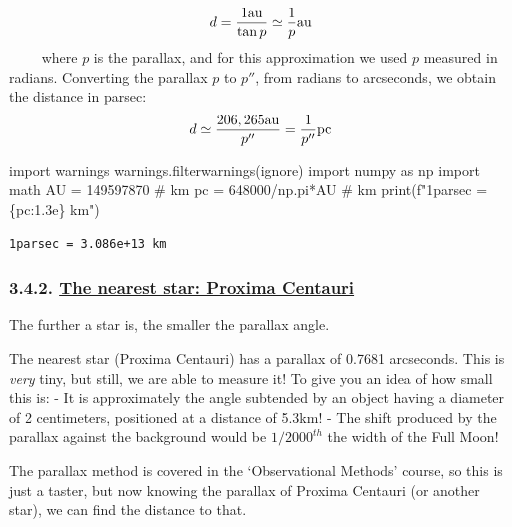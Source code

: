 \documentclass[
  letterpaper,
  DIV=11,
  numbers=noendperiod]{scrartcl}
\newenvironment{Shaded}{\begin{snugshade}}{\end{snugshade}}
\newcommand{\BuiltInTok}[1]{\textcolor[rgb]{0.00,0.23,0.31}{#1}}
\newcommand{\CommentTok}[1]{\textcolor[rgb]{0.37,0.37,0.37}{#1}}
\newcommand{\DecValTok}[1]{\textcolor[rgb]{0.68,0.00,0.00}{#1}}
\newcommand{\ImportTok}[1]{\textcolor[rgb]{0.00,0.46,0.62}{#1}}
\newcommand{\NormalTok}[1]{\textcolor[rgb]{0.00,0.23,0.31}{#1}}
\newcommand{\OperatorTok}[1]{\textcolor[rgb]{0.37,0.37,0.37}{#1}}
\newcommand{\SpecialCharTok}[1]{\textcolor[rgb]{0.37,0.37,0.37}{#1}}
\newcommand{\SpecialStringTok}[1]{\textcolor[rgb]{0.13,0.47,0.30}{#1}}
\newcommand{\StringTok}[1]{\textcolor[rgb]{0.13,0.47,0.30}{#1}}
\begin{document}
\[
    d =\dfrac{1 \rm{au}}{\tan p}\simeq \dfrac{1}{p} \rm{au} 
\] \(\qquad\) where \(p\) is the parallax, and for this approximation we
used \(p\) measured in radians. Converting the parallax \(p\) to
\(p''\), from radians to arcseconds, we obtain the distance in parsec:
\[
    d \simeq\dfrac{206,265 \rm{au}}{p''}= \dfrac{1}{p''} \rm{pc} 
\]

\begin{Shaded}
\begin{Highlighting}[]
\ImportTok{import}\NormalTok{ warnings}
\NormalTok{warnings.filterwarnings(}\StringTok{\textquotesingle{}ignore\textquotesingle{}}\NormalTok{)}
\ImportTok{import}\NormalTok{ numpy }\ImportTok{as}\NormalTok{ np}
\ImportTok{import}\NormalTok{ math}
\NormalTok{AU }\OperatorTok{=} \DecValTok{149597870} \CommentTok{\# km}
\NormalTok{pc }\OperatorTok{=} \DecValTok{648000}\OperatorTok{/}\NormalTok{np.pi}\OperatorTok{*}\NormalTok{AU }\CommentTok{\# km}
\BuiltInTok{print}\NormalTok{(}\SpecialStringTok{f"1parsec = }\SpecialCharTok{\{}\NormalTok{pc}\SpecialCharTok{:1.3e\}}\SpecialStringTok{ km"}\NormalTok{)}
\end{Highlighting}
\end{Shaded}

\begin{verbatim}
1parsec = 3.086e+13 km
\end{verbatim}

\hypertarget{the-nearest-star-proxima-centauri}{%
\subsubsection{\texorpdfstring{3.4.2. \protect\hyperlink{toc0_}{The
nearest star: Proxima
Centauri}}{3.4.2. The nearest star: Proxima Centauri}}\label{the-nearest-star-proxima-centauri}}

The further a star is, the smaller the parallax angle.

The nearest star (Proxima Centauri) has a parallax of 0.7681 arcseconds.
This is \emph{very} tiny, but still, we are able to measure it! To give
you an idea of how small this is: - It is approximately the angle
subtended by an object having a diameter of 2 centimeters, positioned at
a distance of 5.3km! - The shift produced by the parallax against the
background would be \(1/2000^{th}\) the width of the Full Moon!

The parallax method is covered in the `Observational Methods' course, so
this is just a taster, but now knowing the parallax of Proxima Centauri
(or another star), we can find the distance to that.
\end{document}
